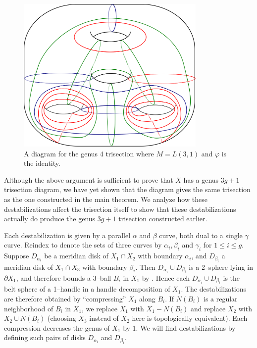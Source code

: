 \documentclass[12pt]{amsart}
\newcommand{\del}{\partial }
\theoremstyle{definition}
\theoremstyle{remark}
\begin{document}
\begin{figure}[h]
\centering
\includegraphics[height=3in]{LxS12destab.png}
\caption{A diagram for the genus 4 trisection where $M = L(3,1)$ and $\varphi$ is the identity.
}
\label{ls12destab}
\end{figure}

Although the above argument is sufficient to prove that $X$ has a genus $3g+1$ trisection diagram, we have yet shown that the diagram gives the same trisection as the one constructed in the main theorem.
We analyze how these destabilizations affect the trisection itself to show that these destabilizations actually do produce the genus $3g+1$ trisection constructed earlier.


Each destabilization is given by a parallel $\alpha$ and $\beta$ curve, both dual to a single $\gamma$ curve.
Reindex to denote the sets of three curves by $\alpha_i,\beta_i$ and $\gamma_i$ for $1 \le i \le g$.
Suppose $D_{\alpha_i}$ be a meridian disk of $X_1 \cap X_2$ with boundary $\alpha_i$, and $D_{\beta_i}$ a meridian disk of $X_1 \cap X_3$ with boundary $\beta_i$.
Then $D_{\alpha_i} \cup D_{\beta_i}$ is a 2--sphere lying in $\del X_1$, and therefore bounds a 3--ball $B_i$ in $X_1$ by \cite{LaudenbachPoenaru1}.
Hence each $D_{\alpha_i} \cup D_{\beta_i}$ is the belt sphere of a 1--handle in a handle decomposition of $X_1$.
The destabilizations are therefore obtained by ``compressing'' $X_1$ along $B_i$.
If $N(B_i)$ is a regular neighborhood of $B_i$ in $X_1$, we replace $X_1$ with $X_1 - N(B_i)$ and replace $X_2$ with $X_2 \cup N(B_i)$ (choosing $X_3$ instead of $X_2$ here is topologically equivalent).
Each compression decreases the genus of $X_1$ by 1.  We will find destabilizations by defining such pairs of disks $D_{\alpha_i}$ and $D_{\beta_i}$.
\end{document}

